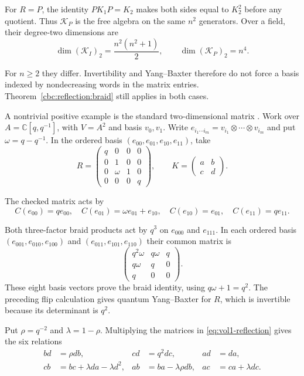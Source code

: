 For $R=P$, the identity $PK_1P=K_2$ makes both sides equal to $K_2^2$
before any quotient.  Thus $\mathcal K_P$ is the free algebra on the same
$n^2$ generators.  Over a field, their degree-two dimensions are
\[
 \dim(\mathcal K_I)_2=\frac{n^2(n^2+1)}2,\qquad
 \dim(\mathcal K_P)_2=n^4.
\]

For $n\geq2$ they differ.  Invertibility and Yang--Baxter therefore do not
force a basis indexed by nondecreasing words in the matrix entries.
Theorem~\ref{cbc:reflection:braid} still applies in both cases.

A nontrivial positive example is the standard two-dimensional matrix
\cite[(5)]{KulishSklyaninReflection1992}.
Work over $A=\mathbb C[q,q^{-1}]$, with $V=A^2$ and basis $v_0,v_1$.
Write $e_{i_1\cdots i_m}=v_{i_1}\otimes\cdots\otimes v_{i_m}$ and put
$\omega=q-q^{-1}$.  In the ordered basis
$(e_{00},e_{01},e_{10},e_{11})$, take
\[
 R=\begin{pmatrix}
 q&0&0&0\\
 0&1&0&0\\
 0&\omega&1&0\\
 0&0&0&q
 \end{pmatrix},\qquad
 K=\begin{pmatrix}a&b\\c&d\end{pmatrix}.
\]

The checked matrix acts by
\[
 C(e_{00})=qe_{00},\quad C(e_{01})=\omega e_{01}+e_{10},\quad
 C(e_{10})=e_{01},\quad C(e_{11})=qe_{11}.
\]

Both three-factor braid products act by $q^3$ on $e_{000}$ and $e_{111}$.
In each ordered basis $(e_{001},e_{010},e_{100})$ and
$(e_{011},e_{101},e_{110})$ their common
matrix is
\[
 \begin{pmatrix}
 q^2\omega&q\omega&q\\
 q\omega&q&0\\
 q&0&0
 \end{pmatrix}.
\]
These eight basis vectors prove the braid identity, using
$q\omega+1=q^2$.  The preceding flip calculation gives quantum
Yang--Baxter for $R$, which is invertible because its determinant is $q^2$.

Put $\rho=q^{-2}$ and $\lambda=1-\rho$.
Multiplying the matrices in \eqref{eq:vol1-reflection} gives the six
relations
\begin{equation}\label{cbc:reflection:rules}
 \begin{aligned}
 bd&=\rho db,& cd&=q^2dc,& ad&=da,\\
 cb&=bc+\lambda da-\lambda d^2,&
 ab&=ba-\lambda\rho db,&
 ac&=ca+\lambda dc.
 \end{aligned}
\end{equation}

